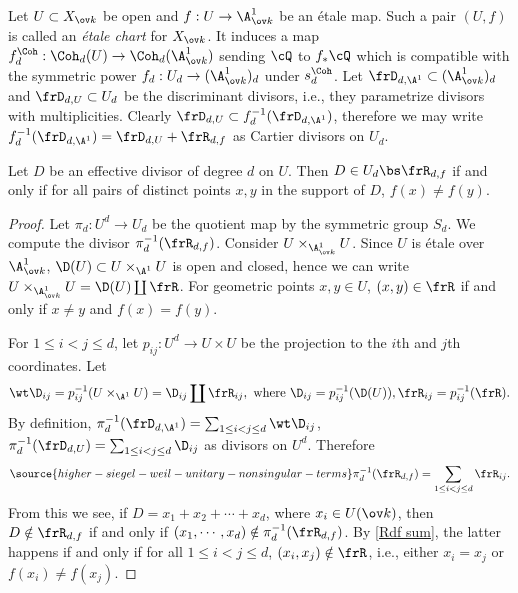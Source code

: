 Let $U\subset X_{\ov k}$ be open and $f:U\to \A^{1}_{\ov k}$ be an \'etale map. Such a pair $(U,f)$ is called an {\em \'etale chart} for $X_{\ov k}$. It induces a map $f^{\Coh}_{d}: \Coh_{d}(U)\to \Coh_{d}(\A^{1}_{\ov k})$ sending $\cQ$ to $f_{*}\cQ$ which is compatible with the symmetric power $f_{d}: U_{d}\to (\A^{1}_{\ov k})_{d}$ under $s^{\Coh}_{d}$. Let $\frD_{d,\A^{1}}\subset (\A^{1}_{\ov k})_{d}$ and $\frD_{d,U}\subset U_{d}$  be the discriminant divisors, i.e., they parametrize divisors with  multiplicities.  Clearly $\frD_{d,U}\subset f^{-1}_{d}(\frD_{d,\A^{1}})$, therefore we may write $f^{-1}_{d}(\frD_{d,\A^{1}})=\frD_{d,U}+\frR_{d,f}$ as Cartier divisors on $U_{d}$.

\begin{lemma}
\notready\label{l:not in R}
Let $D$ be an effective divisor of degree $d$ on $U$. Then $D\in U_{d}\bs \frR_{d,f}$ if and only if for all pairs of distinct points $x,y$ in the support of $D$, $f(x)\ne f(y)$.
\end{lemma}
\begin{proof}
Let $\pi_{d}: U^{d}\to U_{d}$ be the quotient map by the symmetric group $S_{d}$. We compute the divisor $\pi_{d}^{-1}(\frR_{d,f})$. Consider $U\times_{\A^{1}_{\ov k}} U$. Since $U$ is \'etale over $\A^{1}_{\ov k}$, $\D(U)\subset U\times_{\A^{1}} U$ is open and closed, hence we can write $U\times_{\A^{1}_{\ov k}}U=\D(U)\coprod \frR$. For geometric points $x,y\in U$,  $(x,y)\in \frR$ if and only if $x\ne y$ and $f(x)=f(y)$.

For $1\le i<j\le d$, let $p_{ij}: U^{d}\to U\times U$ be the projection to the $i$th and $j$th coordinates. Let
$$\wt\D_{ij}=p_{ij}^{-1}(U\times_{\A^{1}}U)=\D_{ij}\coprod \frR_{ij}, \mbox{ where }\D_{ij}=p_{ij}^{-1}(\D(U)), \frR_{ij}=p_{ij}^{-1}(\frR).$$
By definition, $\pi_{d}^{-1}(\frD_{d,\A^{1}})=\sum_{1\le i< j\le d}\wt\D_{ij}$, $\pi_{d}^{-1}(\frD_{d,U})=\sum_{1\le i< j\le d}\D_{ij}$ as divisors on $U^{d}$. Therefore
\begin{equation}\label{Rdf sum}
\source{higher-siegel-weil-unitary-nonsingular-terms}
\pi_{d}^{-1}(\frR_{d,f})=\sum_{1\le i< j\le d}\frR_{ij}.
\end{equation}
From this we see, if $D=x_{1}+x_{2}+\cdots+x_{d}$, where $x_{i}\in U(\ov k)$, then $D\notin \frR_{d,f}$ if and only if $(x_{1},\cdots, x_{d})\notin \pi_{d}^{-1}(\frR_{d,f})$. By \eqref{Rdf sum}, the latter happens if and only if for all $1\le i<j\le d$, $(x_{i},x_{j})\notin \frR$, i.e., either $x_{i}=x_{j}$ or $f(x_{i})\ne f(x_{j})$.
\end{proof}




